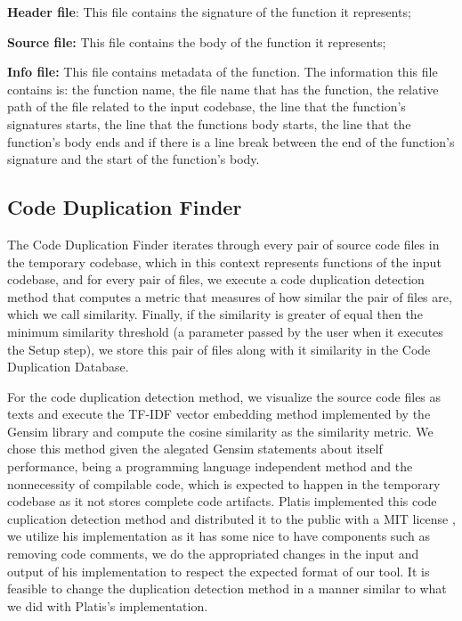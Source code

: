 \begin{itemize}
	\begin{item}
		\textbf{Header file}: This file contains the signature of the function it represents;
	\end{item}
	\begin{item}
		\textbf{Source file:} This file contains the body of the function it represents;
	\end{item}
	\begin{item}
		\textbf{Info file:} This file contains metadata of the function. The information this file contains is:
		the function name, the file name that has the function, the relative path of the file related to the input codebase, 
		the line that the function's signatures starts, the line that the functions body starts, the line that the function's body 
		ends and if there is a line break between the end of the function's signature and the start of the function's body.
		
	\end{item}
\end{itemize}

\subsection{Code Duplication Finder}

The Code Duplication Finder iterates through every pair of source code files in the temporary codebase, which in this context represents
functions of the input codebase, and for every pair of files, we execute a code duplication detection method that computes a metric
that measures of how similar the pair of files are, which we call similarity. Finally, if the similarity is greater of equal then the
minimum similarity threshold (a parameter passed by the user when it executes the Setup step), we store this pair of files along with
it similarity in the Code Duplication Database.

For the code duplication detection method, we visualize the source code files as texts and execute the TF-IDF vector embedding method
implemented by the Gensim library \citep{gensim} and compute the cosine similarity as the similarity metric. We chose this method 
given the alegated Gensim statements about itself performance, being a programming language independent method and the nonnecessity of 
compilable code, which is expected to happen in the temporary codebase as it not stores complete code artifacts. Platis implemented
this code cuplication detection method and distributed it to the public with a MIT license \citep{platistool,mitlicense} ,
we utilize his implementation as it has some nice to have components such as removing code comments, we do the appropriated changes
in the input and output of his implementation to respect the expected format of our tool. 
It is feasible to change the duplication detection method in a manner similar to what we did with Platis's implementation.


